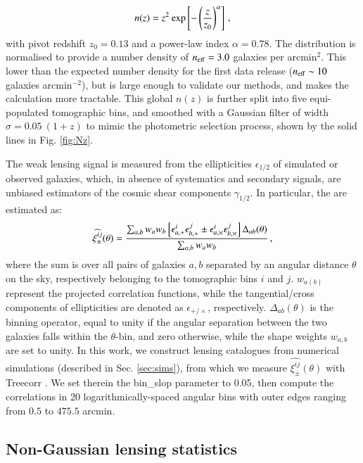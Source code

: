 \begin{eqnarray}
n (z) =  z^2 \: {\rm exp} \left[-\left(\frac{z}{z_0}\right)^\alpha \right]\, ,
\label{eq:nz}
\end{eqnarray}
with pivot redshift $z_0=0.13$ and a power-law index $\alpha = 0.78$.
The distribution is normalised to provide a number density of $n_{\rm eff} = 3.0 $  galaxies per arcmin$^{2}$.
This lower than the expected number density for the first data release ($n_{\rm eff}\sim10$ galaxies arcmin$^{-2}$), but is large enough to validate our methods, and makes the calculation more tractable.
This global $n(z)$ is further split into five equi-populated tomographic bins, and smoothed with a Gaussian filter of width $\sigma = 0.05 \: (1 + z)$ to mimic the photometric selection process, shown by the solid lines in Fig. \ref{fig:Nz}. 

The weak lensing signal is measured from the ellipticities $\epsilon_{1/2}$ of simulated or observed galaxies, which, in absence of systematics and secondary signals, are unbiased estimators  of the cosmic shear components $\gamma_{1/2}$.
In particular, the \gtwopcf are estimated as:
\begin{eqnarray}
\widehat{\xi_{\pm}^{ij}}(\theta) = \frac{\sum_{a,b} w_a w_b \left[\epsilon_{a, \rm +}^i\epsilon_{b, \rm +}^j     \pm \epsilon_{a, \times}^i\epsilon_{b, \times}^j    \right]\Delta_{ab}(\theta)}{\sum_{a,b} w_a w_b} \, ,
\label{eq:2PCF_estimator}
\end{eqnarray}
where the sum is over all pairs of galaxies $a, b$ separated by an angular distance $\theta$ on the sky, respectively belonging to the tomographic bins $i$ and $j$.
$w_{a (b)}$ represent the projected correlation functions, while the tangential/cross components of ellipticities are denoted as $\epsilon_{+/\times}$, respectively. 
$\Delta_{ab}(\theta)$ is the binning operator, equal to unity if the angular separation between the two galaxies falls within the $\theta$-bin, and zero otherwise, while the shape weights $w_{a,b}$ are set to unity.
In this work, we construct lensing catalogues from numerical simulations (described in Sec. \ref{sec:sims}), from which we measure $ \widehat{\xi_{\pm}^{ij}}(\theta)$ with {\sc Treecorr} \citep{TreeCorr}.
We set therein the {\sc bin\_slop} parameter to 0.05, then compute the correlations in 20 logarithmically-spaced angular bins with outer edges ranging from $0.5$ to $475.5$ arcmin. 
 
 
\subsection{Non-Gaussian lensing statistics}
\label{subsec:beyond-2pt}

